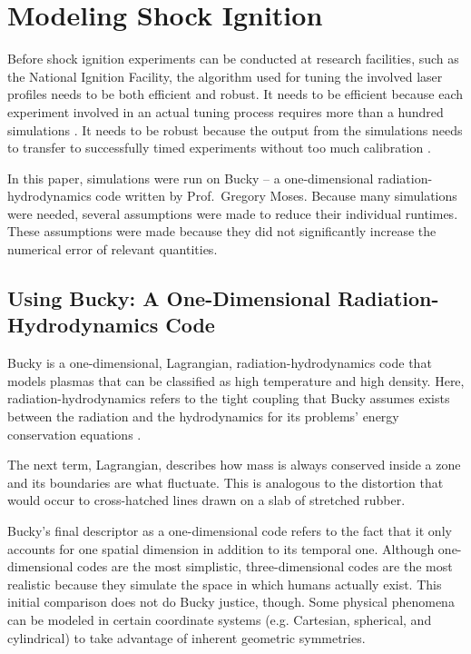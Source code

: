 
\vspace{24pt}

\chapter[\textbf{Modeling Shock Ignition}]{Modeling Shock Ignition}

Before shock ignition experiments can be conducted at research facilities, such as the National Ignition Facility, the algorithm used for tuning the involved laser profiles needs to be both efficient and robust.  It needs to be efficient because each experiment involved in an actual tuning process requires more than a hundred simulations \citep{terryThesis}.  It needs to be robust because the output from the simulations needs to transfer to successfully timed experiments without too much calibration \citep{terryPaper}.  

In this paper, simulations were run on Bucky -- a one-dimensional radiation-hydrodynamics code written by Prof.\ Gregory Moses.  Because many simulations were needed, several assumptions were made to reduce their individual runtimes.  These assumptions were made because they did not significantly increase the numerical error of relevant quantities. 

\section{Using Bucky: A One-Dimensional Radiation-Hydrodynamics Code}
  
Bucky is a one-dimensional, Lagrangian, radiation-hydrodynamics code that models plasmas that can be classified as high temperature and high density.  Here, radiation-hydrodynamics refers to the tight coupling that Bucky assumes exists between the radiation and the hydrodynamics for its problems' energy conservation equations \citep{bucky}.

The next term, Lagrangian, describes how mass is always conserved inside a zone and its boundaries are what fluctuate.  This is analogous to the distortion that would occur to cross-hatched lines drawn on a slab of stretched rubber.  

Bucky's final descriptor as a one-dimensional code refers to the fact that it only accounts for one spatial dimension in addition to its temporal one. Although one-dimensional codes are the most simplistic, three-dimensional codes are the most realistic because they simulate the space in which humans actually exist. This initial comparison does not do Bucky justice, though. Some physical phenomena can be modeled in certain coordinate systems (e.g. Cartesian, spherical, and cylindrical) to take advantage of inherent geometric symmetries. 

